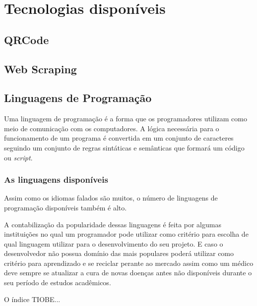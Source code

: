 \chapter{Tecnologias disponíveis} \label{Tecnologias disponíveis}

\section{QRCode}

\section{Web Scraping}

\section{Linguagens de Programação}

Uma linguagem de programação é a forma que os programadores utilizam como meio de comunicação com os computadores. A lógica necessária para o funcionamento de um programa é convertida em um conjunto de caracteres seguindo um conjunto de regras sintáticas e semânticas que formará um código ou \textit{script}.

\subsection{As linguagens disponíveis}

Assim como os idiomas falados são muitos, o número de linguagens de programação disponíveis também é alto.

A contabilização da popularidade dessas linguagens é feita por algumas instituições no qual um programador pode utilizar como critério para escolha de qual linguagem utilizar para o desenvolvimento do seu projeto. E caso o desenvolvedor não possua domínio das mais populares poderá utilizar como critério para aprendizado e se reciclar perante ao mercado assim como um médico deve sempre se atualizar a cura de novas doenças antes não disponíveis durante o seu período de estudos acadêmicos.


O índice TIOBE...


